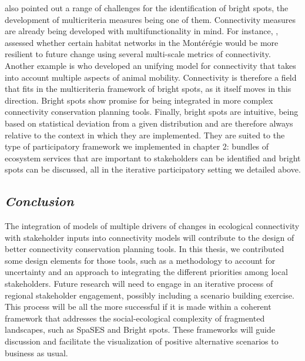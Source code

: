 \documentclass[12pt,Bold,TexShade]{thesis/mcgilletdclass}
\begin{document}
{\citeauthor{frei_bright_2018} also pointed out a range of challenges for the identification of bright spots, the development of multicriteria measures being one of them. Connectivity measures are already being developed with  multifunctionality in mind. For instance, \cite{rayfield_priorisation_2018}, assessed whether certain habitat networks in the Montérégie would be more resilient to future change using several multi-scale metrics of connectivity. Another example is \cite{fletcher_towards_2019} who developed an unifying model for connectivity that takes into account multiple aspects of animal mobility. Connectivity is therefore a field that fits in the multicriteria framework of bright spots, as it itself moves in this direction.  Bright spots show promise for being integrated in more complex connectivity conservation planning tools. Finally, bright spots are intuitive, being based on statistical deviation from a given distribution and are therefore always relative to the context in which they are implemented. They are suited to the type of participatory framework we implemented in chapter 2: bundles of ecosystem services that are important to stakeholders can be identified and bright spots can be discussed, all in the iterative participatory setting we detailed above. \\

\vspace{3em}

\subsection*{\textit{Conclusion \\ \vspace{2em}}}

The integration of models of multiple drivers of changes in ecological connectivity with stakeholder inputs into connectivity models will contribute to the design of better connectivity conservation planning tools. In this thesis, we contributed some design elements for those tools, such as a methodology to account for uncertainty and an approach to integrating the different  priorities among local stakeholders. Future research will need to engage in an iterative process of regional stakeholder engagement, possibly including a scenario building exercise. This process will be all the more successful if it is made within a coherent framework that addresses the social-ecological complexity of fragmented landscapes, such as SpaSES and Bright spots. These frameworks will guide discussion and facilitate the visualization of positive alternative scenarios to business as usual. \\
}%

\Disc%

%




\printbibliography[heading=bibintoc, section=0, title={General Bibliography \vspace{1em}}]
\end{document}
